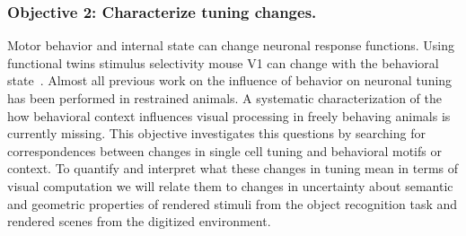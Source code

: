 \documentclass[COG,11pt]{ercgrant}
\begin{document}


\subsubsection{Objective 2:  Characterize tuning changes. \hfill{}}
Motor behavior and internal state can change neuronal response functions\parencite{Chiappe2010-bm, Bezdudnaya2006-ge, Andermann2011-vw, Treue1996-lp}. Using functional twins stimulus selectivity mouse V1 can change with the behavioral state~\parencite{Franke2022-do}.
Almost all previous work on the influence of behavior on neuronal tuning has been performed in restrained animals. 
A systematic characterization of the how behavioral context influences visual processing in freely behaving animals is currently missing. 
This objective investigates this questions by searching for correspondences between changes in single cell tuning and behavioral motifs or context.
To quantify and interpret what these changes in tuning mean in terms of visual computation we will relate them to changes in uncertainty about semantic and geometric properties of rendered stimuli from the object recognition task and rendered scenes from the digitized environment.

\end{document}
